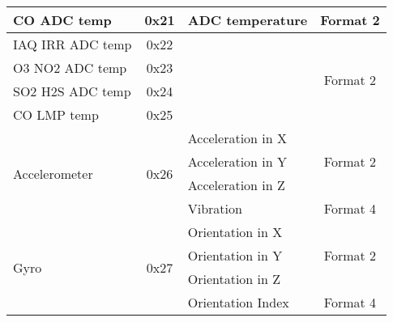 \begin{center}
\begin{longtable}{|l|c|>{\centering}p{}|c|}
        CO ADC temp & 0x21 & ADC temperature & Format 2 \\ \hline
        IAQ IRR ADC temp & 0x22 & \multirow{4}{*}{ADC temperature} & \multirow{4}{*}{Format 2} \\ \cline{1-2}
        O3 NO2 ADC temp & 0x23 & & \\ \cline{1-2}
        SO2 H2S ADC temp & 0x24 & & \\ \cline{1-2}
        CO LMP temp & 0x25 & &\\ \hline
        \multirow{4}{*}{Accelerometer} & \multirow{4}{*}{0x26} & Acceleration in X & \multirow{3}{*}{Format 2} \\ \cline{3-3}
        & & Acceleration in Y & \\ \cline{3-3}
        & & Acceleration in Z & \\ \cline{3-4}
        & & Vibration & Format 4\\ \hline
        \multirow{4}{*}{Gyro} & \multirow{4}{*}{0x27} & Orientation in X & \multirow{3}{*}{Format 2} \\ \cline{3-3}
        & & Orientation in Y & \\ \cline{3-3}
        & & Orientation in Z & \\ \cline {3-4}
        & & Orientation Index & Format 4\\ \hline


\end{longtable}
\end{center}
